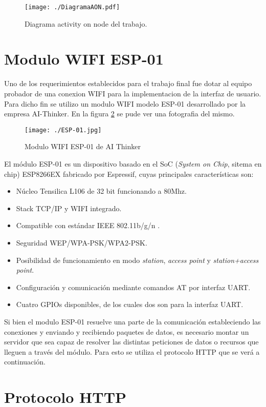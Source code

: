 \begin{figure}[H]
	\centering
	\texttt{[image: ./DiagramaAON.pdf]}
	\caption{Diagrama activity on node del trabajo.}
	\label{fig:AON}
\end{figure}

\section{Modulo WIFI ESP-01}
Uno de los requerimientos establecidos para el trabajo final fue dotar al equipo probador de una conexion WIFI para la implementacion de la interfaz de usuario. Para dicho fin se utilizo un modulo WIFI modelo ESP-01 desarrollado por la empresa AI-Thinker. En la figura \ref{fig:ESP01} se pude ver una fotografia del mismo.

\begin{figure}[H]
	\centering
	\texttt{[image: ./ESP-01.jpg]}
	\caption{Modulo WIFI ESP-01 de AI Thinker}
	\label{fig:ESP01}
\end{figure}

El módulo ESP-01 es un dispositivo basado en el SoC (\emph{System on Chip}, sitema en chip) ESP8266EX fabricado por Espressif,
cuyas principales características son:
\begin{itemize}
	\item Núcleo Tensilica L106 de 32 bit funcionando a 80Mhz.
	\item Stack TCP/IP y WIFI integrado.
	\item Compatible con estándar IEEE 802.11b/g/n .
	\item Seguridad WEP/WPA-PSK/WPA2-PSK.
	\item Posibilidad de funcionamiento en modo \emph{station}, \emph{access point} y \emph{station+access point}.
	\item Configuración y comunicación mediante comandos AT por interfaz UART.
	\item Cuatro GPIOs disponibles, de los cuales dos son para la interfaz UART.

\end{itemize}

Si bien el modulo ESP-01 resuelve una parte de la comunicación estableciendo las conexiones y enviando y recibiendo paquetes de datos, es necesario montar un servidor que sea capaz de resolver las distintas peticiones de datos o recursos que lleguen a través del módulo. Para esto se utiliza el protocolo HTTP que se verá a continuación. 

\section{Protocolo HTTP}


